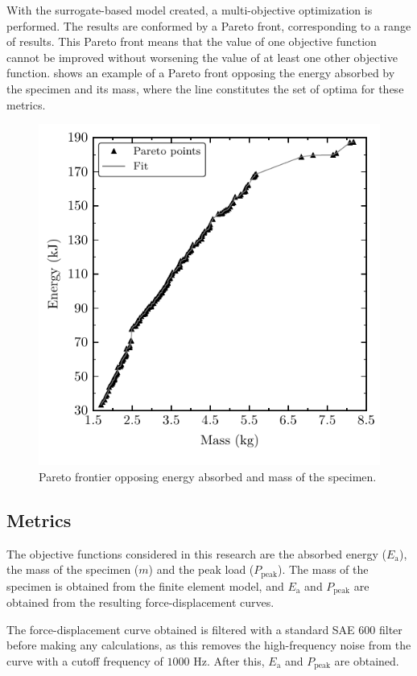 \documentclass[cmfonts]{witpress}
\begin{document}
With the surrogate-based model created, a multi-objective optimization is performed. The results are conformed by a Pareto front, corresponding to a range of results. This Pareto front means that the value of one objective function cannot be improved without worsening the value of at least one other objective function.  shows an example of a Pareto front opposing the energy absorbed by the specimen and its mass, where the line constitutes the set of optima for these metrics.

\begin{figure}[htpb]
  \centering
   \includegraphics[width=.8\columnwidth]{figures/IMG/Pareto}
  \caption{Pareto frontier opposing energy absorbed and mass of the specimen.}
  \label{fig:Pareto}
\end{figure}

\subsection{Metrics}

The objective functions considered in this research are the absorbed energy ($E_\text{a}$), the mass of the specimen ($m$) and the peak load ($P_\text{peak}$). The mass of the specimen is obtained from the finite element model, and $E_\text{a}$ and $P_\text{peak}$ are obtained from the resulting force-displacement curves.

The force-displacement curve obtained is filtered with a standard SAE 600 filter \cite{J211} before making any calculations, as this removes the high-frequency noise from the curve with a cutoff frequency of ${1000}$ Hz. After this, $E_\text{a}$ and $P_\text{peak}$ are obtained.
\end{document}
